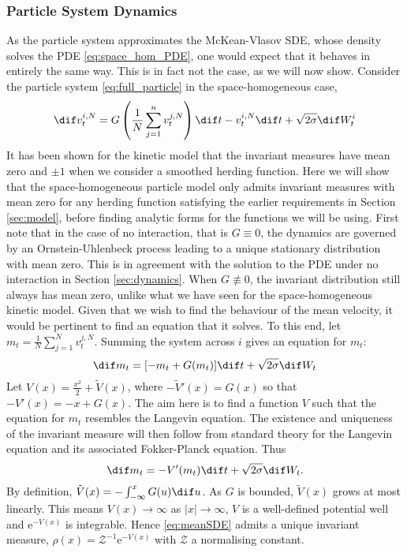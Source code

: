 \documentclass[11pt, a4pape draft]{article}
\begin{document}
    \subsubsection{Particle System Dynamics}
        As the particle system approximates the McKean-Vlasov SDE, whose density solves the PDE \eqref{eq:space_hom_PDE}, one would expect that it behaves in entirely the same way. This is in fact not the case, as we will now show. Consider the particle system \eqref{eq:full_particle} in the space-homogeneous case,
        \begin{equation}\label{eq:hom_particle}
            \dif v^{i,N}_t = G\left(\frac{1}{N}\sum_{j=1}^n v^{j,N}_t\right)\dif t-v^{i,N}_t \dif t + \sqrt{2\sigma} \dif W^i_t
        \end{equation}
        It has been shown for the kinetic model that the invariant measures have mean zero and $\pm 1$ when we consider a smoothed herding function. Here we will show that the space-homogeneous particle model only admits invariant measures with mean zero for any herding function satisfying the earlier requirements in Section \ref{sec:model}, before finding analytic forms for the functions we will be using. First note that in the case of no interaction, that is $G\equiv 0$, the dynamics are governed by an Ornstein-Uhlenbeck process leading to a unique stationary distribution with mean zero. This is in agreement with the solution to the PDE under no interaction in Section \ref{sec:dynamics}. When $G\not\equiv 0$, the invariant distribution still always has mean zero, unlike what we have seen for the space-homogeneous kinetic model. Given that we wish to find the behaviour of the mean velocity, it would be pertinent to find an equation that it solves. To this end, let $m_t = \frac{1}{N}\sum_{j=1}^N v^{j,N}_t$. Summing the system across $i$ gives an equation for $m_t$:
        \[
            \dif m_t = \lbrack -m_t + G(m_t)\rbrack \dif t +\sqrt{2\sigma}\dif W_t
        \]
        Let $V(x) = \frac{x^2}{2} + \tilde{V}(x)$, where $-\tilde{V}'(x) = G(x)$ so that $-V'(x) = -x + G(x)$. The aim here is to find a function $V$ such that the equation for $m_t$ resembles the Langevin equation. The existence and uniqueness of the invariant measure will then follow from standard theory for the Langevin equation and its associated Fokker-Planck equation. Thus
        \begin{equation}\label{eq:meanSDE}
            \dif m_t = -V'(m_t)\dif t + \sqrt{2\sigma}\dif W_t.
        \end{equation}    
        By definition, $\tilde{V}(x) = - \int_{-\infty}^x G(u) \dif u$. As $G$ is bounded, $\tilde{V}(x)$ grows at most linearly. This means $V(x) \to \infty$ as $|x|\to \infty$, $V$ is a well-defined potential well and $\mathrm{e}^{-V(x)}$ is integrable. Hence \eqref{eq:meanSDE} admits a unique invariant measure, $\rho(x) = \mathcal{Z}^{-1}\mathrm{e}^{-V(x)}$ with $\mathcal{Z}$ a normalising constant.
        
\end{document}
